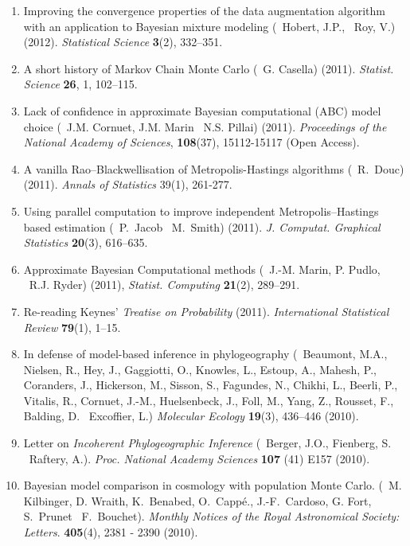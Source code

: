 \begin{enumerate}
\item Improving the convergence properties of the data augmentation algorithm with an application to Bayesian 
mixture modeling (\avec~Hobert, J.P., \et~Roy, V.) (2012). {\em Statistical Science} {\bf 3}(2), 332--351.

\item A short history of Markov Chain Monte Carlo (\avec\ G. Casella) (2011). {\em Statist. Science} {\bf 26}, 1, 102--115.

\item Lack of confidence in approximate Bayesian computational (ABC) model choice (\avec~J.M. Cornuet, J.M. Marin
\et~N.S. Pillai) (2011). {\em Proceedings of the National Academy of Sciences}, {\bf 108}(37), 15112-15117 
(Open Access). 

\item A vanilla Rao--Blackwellisation of Metropolis-Hastings algorithms
(\avec~R.~Douc) (2011).  {\em Annals of Statistics} 39(1), 261-277.

\item Using parallel computation to improve independent Metropolis--Hastings based estimation (\avec~P.~Jacob
\et\ M.~Smith) (2011).  {\em J. Computat. Graphical Statistics} {\bf 20}(3), 616--635.

\item Approximate Bayesian Computational methods (\avec~J.-M. Marin, P. Pudlo, \et\ R.J. Ryder) (2011),
{\em Statist. Computing} {\bf 21}(2), 289--291.

\item Re-reading Keynes' {\em Treatise on Probability} (2011). {\em International Statistical Review} {\bf 79}(1),
1--15.

\item In defense of model-based inference in phylogeography (\avec\ Beaumont, M.A., Nielsen, R., Hey, J., 
Gaggiotti, O., Knowles, L., Estoup, A., Mahesh, P., Coranders, J., Hickerson, M., Sisson, S., Fagundes, N., 
Chikhi, L., Beerli, P., Vitalis, R., Cornuet, J.-M., Huelsenbeck, J., Foll, M., Yang, Z., Rousset, F., 
Balding, D. \et\ Excoffier, L.) {\em Molecular Ecology} {\bf 19}(3), 436--446 (2010).

\item Letter on {\em Incoherent Phylogeographic Inference}
(\avec~Berger, J.O., Fienberg, S. \et\ Raftery, A.). {\em 
Proc. National Academy Sciences} {\bf 107} (41) E157 (2010).

\item Bayesian model comparison in cosmology with population Monte Carlo.
(\avec~M. Kilbinger, D. Wraith, K.~Benabed, O.~Capp\'e., J.-F.~Cardoso, G. Fort, S.~Prunet \et\  F.~Bouchet).
{\em Monthly Notices of the Royal Astronomical Society: Letters}. {\bf 405}(4), 2381 - 2390 (2010).


\end{enumerate}
